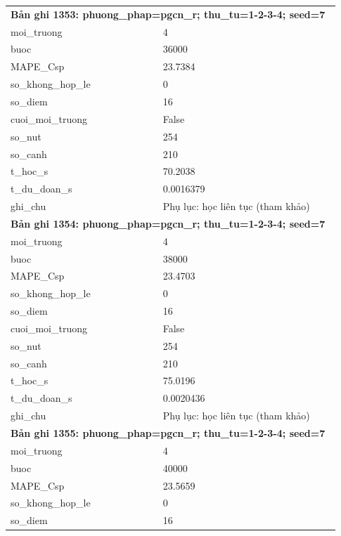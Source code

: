 \begin{longtable}{p{0.43\linewidth}p{0.50\linewidth}}
\midrule
\multicolumn{2}{p{0.95\linewidth}}{\textbf{Bản ghi 1353: phuong\_phap=pgcn\_r; thu\_tu=1-2-3-4; seed=7}} \\
moi\_\allowbreak truong & 4 \\
buoc & 36000 \\
MAPE\_\allowbreak Csp & 23.7384 \\
so\_\allowbreak khong\_\allowbreak hop\_\allowbreak le & 0 \\
so\_\allowbreak diem & 16 \\
cuoi\_\allowbreak moi\_\allowbreak truong & False \\
so\_\allowbreak nut & 254 \\
so\_\allowbreak canh & 210 \\
t\_\allowbreak hoc\_\allowbreak s & 70.2038 \\
t\_\allowbreak du\_\allowbreak doan\_\allowbreak s & 0.0016379 \\
ghi\_\allowbreak chu & Phụ lục: học liên tục (tham khảo) \\
\midrule
\multicolumn{2}{p{0.95\linewidth}}{\textbf{Bản ghi 1354: phuong\_phap=pgcn\_r; thu\_tu=1-2-3-4; seed=7}} \\
moi\_\allowbreak truong & 4 \\
buoc & 38000 \\
MAPE\_\allowbreak Csp & 23.4703 \\
so\_\allowbreak khong\_\allowbreak hop\_\allowbreak le & 0 \\
so\_\allowbreak diem & 16 \\
cuoi\_\allowbreak moi\_\allowbreak truong & False \\
so\_\allowbreak nut & 254 \\
so\_\allowbreak canh & 210 \\
t\_\allowbreak hoc\_\allowbreak s & 75.0196 \\
t\_\allowbreak du\_\allowbreak doan\_\allowbreak s & 0.0020436 \\
ghi\_\allowbreak chu & Phụ lục: học liên tục (tham khảo) \\
\midrule
\multicolumn{2}{p{0.95\linewidth}}{\textbf{Bản ghi 1355: phuong\_phap=pgcn\_r; thu\_tu=1-2-3-4; seed=7}} \\
moi\_\allowbreak truong & 4 \\
buoc & 40000 \\
MAPE\_\allowbreak Csp & 23.5659 \\
so\_\allowbreak khong\_\allowbreak hop\_\allowbreak le & 0 \\
so\_\allowbreak diem & 16 \\

\end{longtable}
